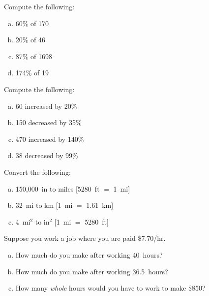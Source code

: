 \documentclass[11pt,letterpaper]{article}
\begin{document}


 Compute the following:
\begin{enumerate}[(a)]
\item 60\% of 170
\item 20\% of 46
\item 87\% of 1698
\item 174\% of 19
\end{enumerate}



\newpage



 Compute the following:
\begin{enumerate}[(a)]
\item 60 increased by 20\%
\item 150 decreased by 35\%
\item 470 increased by 140\%
\item 38 decreased by 99\%
\end{enumerate}



\newpage



 Convert the following:
\begin{enumerate}[(a)]
\item 150,000~in to miles [5280~ft $=$ 1~mi]
\item 32~mi to km [1~mi $=$ 1.61~km]
\item 4~mi$^2$ to in$^2$ [1~mi $=$ 5280~ft]
\end{enumerate}



\newpage



 Suppose you work a job where you are paid \$7.70/hr. 
\begin{enumerate}[(a)]
\item How much do you make after working 40~hours?
\item How much do you make after working 36.5~hours?
\item How many \textit{whole} hours would you have to work to make \$850?
\end{enumerate}



\newpage
\end{document}
